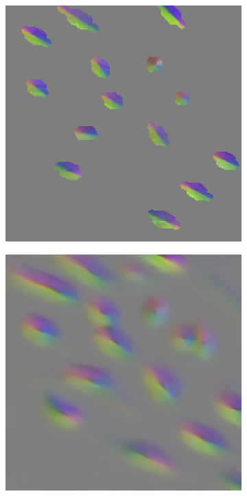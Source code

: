 \begin{figure}[t]
\begin{subfigure}[b]{\mywidth}
		\caption{\label{fig:fi_im_f}}
	\end{subfigure}
	\begin{subfigure}[b]{\mywidth}
		\centering
		\includegraphics[width=\textwidth]{data/images/fieldLearning/fi_field.png}
		\caption{\label{fig:fi_f}}
	\end{subfigure}
	\begin{subfigure}[b]{\mywidth}
		\centering
		\includegraphics[width=\textwidth]{data/images/fieldLearning/fi_result.png}
		\caption{\label{fig:fi_r}}
	\end{subfigure}
	

\end{figure}
